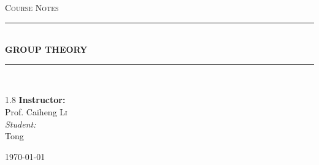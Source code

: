 \documentclass[11pt, a4paper]{report}
\newcommand{\HRule}[1]{\rule{\linewidth}{#1}}
\begin{document}
\begin{titlepage}
    \centering
    \vspace*{2cm}

    \textsc{\Large Course Notes}\\[0.5cm]

    \HRule{1.5pt} \\[0.5cm]
    {\huge \bfseries GROUP THEORY}\\[0.4cm]
    \HRule{1.5pt} \\[1.5cm]

    \vspace{3cm}

    \begin{spacing}{1.8}
        {\Large \textbf{Instructor:}}\\
        {\Large Prof. Caiheng \textsc{Li}}\\[0.8cm]

        {\normalsize \textit{Student:}}\\
        {\normalsize Tong}
    \end{spacing}

    \vfill
    {\large \today}
\end{titlepage}

\newpage
\tableofcontents
\newpage


















\end{document}
